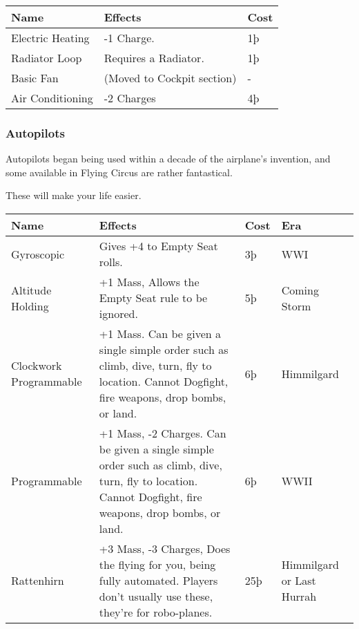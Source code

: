 \documentclass{article}
\begin{document}
\begin{tabular}{|l|l|l|}
  \hline
  Name             & Effects                    & Cost \\\hline
  Electric Heating & -1 Charge.                 & 1þ   \\\hline
  Radiator Loop    & Requires a Radiator.       & 1þ   \\\hline
  Basic Fan        & (Moved to Cockpit section) & -    \\\hline
  Air Conditioning & -2 Charges                 & 4þ   \\\hline
\end{tabular}

\subsubsection{Autopilots}
\label{_Autopilots}

Autopilots began being used within a decade of the airplane's invention,
and some available in Flying Circus are rather fantastical.

These will make your life easier.

\begin{tabular}{|l|l|l|l|}
  \hline
  Name                                                                 & Effects                                                   & Cost       & Era \\\hline
  Gyroscopic                                                           & Gives +4 to Empty Seat rolls.                             & 3þ         & WWI \\\hline
  Altitude Holding                                                     & +1 Mass, Allows the Empty Seat rule to be ignored.        &
  5þ                                                                   & Coming Storm                                                                 \\\hline
  Clockwork Programmable                                               & +1 Mass. Can be given a single simple order
  such as climb, dive, turn, fly to location. Cannot Dogfight, fire
  weapons, drop bombs, or land.                                        & 6þ                                                        & Himmilgard       \\\hline
  Programmable                                                         & +1 Mass, -2 Charges. Can be given a single simple order
  such as climb, dive, turn, fly to location. Cannot Dogfight, fire
  weapons, drop bombs, or land.                                        & 6þ                                                        & WWII             \\\hline
  Rattenhirn                                                           & +3 Mass, -3 Charges, Does the flying for you, being fully
  automated. Players don't usually use these, they're for robo-planes. &
  25þ                                                                  & Himmilgard or Last Hurrah                                                    \\\hline
\end{tabular}
\end{document}
